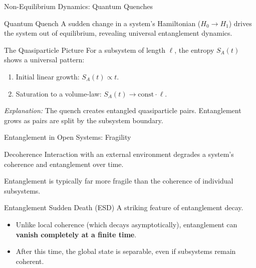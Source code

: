 \begin{frame}{Non-Equilibrium Dynamics: Quantum Quenches}
  \begin{block}{Quantum Quench}
    A sudden change in a system's Hamiltonian ($H_0 \to H_1$) drives the
    system out of equilibrium, revealing universal entanglement dynamics.
  \end{block}
  \pause
  \begin{alertblock}{The Quasiparticle Picture}
    For a subsystem of length $\ell$, the entropy $S_A(t)$ shows a universal
    pattern:
    \begin{enumerate}
      \item Initial \alert{linear growth}: $S_A(t) \propto t$.
      \item \alert{Saturation} to a volume-law: $S_A(t) \to \text{const} \cdot \ell$.
    \end{enumerate}
    \pause
    \textit{Explanation:} The quench creates entangled quasiparticle pairs.
    Entanglement grows as pairs are split by the subsystem boundary.
  \end{alertblock}
\end{frame}

\begin{frame}{Entanglement in Open Systems: Fragility}
  \begin{block}{Decoherence}
    Interaction with an external environment degrades a system's coherence
    and entanglement over time.
    \pause

    Entanglement is typically far more fragile than the coherence of
    individual subsystems.
  \end{block}
  \pause
  \begin{alertblock}{Entanglement Sudden Death (ESD)}
    A striking feature of entanglement decay.
    \begin{itemize}
      \item Unlike local coherence (which decays asymptotically), entanglement
        can \textbf{vanish completely at a finite time}.
      \pause
      \item After this time, the global state is separable, even if
        subsystems remain coherent.
    \end{itemize}
  \end{alertblock}
\end{frame}

